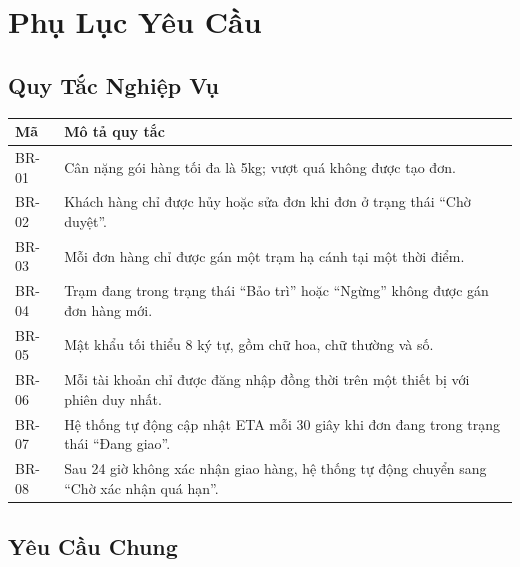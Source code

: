 \section{Phụ Lục Yêu Cầu}

\subsection{Quy Tắc Nghiệp Vụ}

\begin{longtable}{|l|p{12cm}|}
  \hline
  \textbf{Mã} & \textbf{Mô tả quy tắc} \\
  \hline
  \endhead
  \hline
  \endfoot
  BR-01 & Cân nặng gói hàng tối đa là 5kg; vượt quá không được tạo đơn. \\ \hline
  BR-02 & Khách hàng chỉ được hủy hoặc sửa đơn khi đơn ở trạng thái ``Chờ duyệt''. \\ \hline
  BR-03 & Mỗi đơn hàng chỉ được gán một trạm hạ cánh tại một thời điểm. \\ \hline
  BR-04 & Trạm đang trong trạng thái ``Bảo trì'' hoặc ``Ngừng'' không được gán đơn hàng mới. \\ \hline
  BR-05 & Mật khẩu tối thiểu 8 ký tự, gồm chữ hoa, chữ thường và số. \\ \hline
  BR-06 & Mỗi tài khoản chỉ được đăng nhập đồng thời trên một thiết bị với phiên duy nhất. \\ \hline
  BR-07 & Hệ thống tự động cập nhật ETA mỗi 30 giây khi đơn đang trong trạng thái ``Đang giao''. \\ \hline
  BR-08 & Sau 24 giờ không xác nhận giao hàng, hệ thống tự động chuyển sang ``Chờ xác nhận quá hạn''. \\
\end{longtable}

\subsection{Yêu Cầu Chung}

